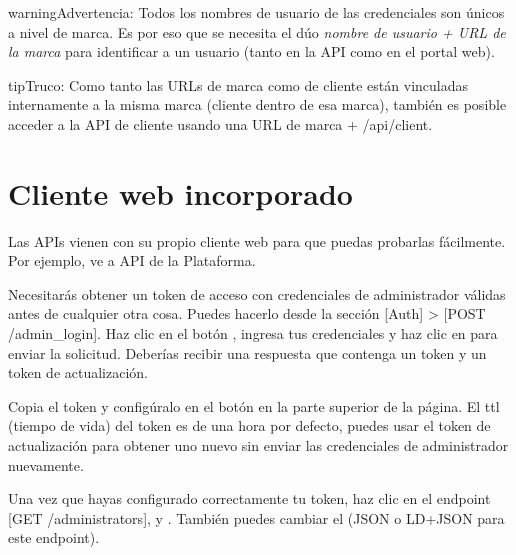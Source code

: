 \documentclass[letterpaper,10pt,spanish]{sphinxmanual}
\begin{document}
\begin{notice}{warning}{Advertencia:}
Todos los nombres de usuario de las credenciales son únicos a nivel de marca. Es por eso que se necesita el dúo \emph{nombre de usuario + URL de la marca} para identificar a un usuario (tanto en la API como en el portal web).
\end{notice}

\begin{notice}{tip}{Truco:}
Como tanto las URLs de marca como de cliente están vinculadas internamente a la misma marca (cliente dentro de esa marca), también es posible acceder a la API de cliente usando una URL de marca + /api/client.
\end{notice}


\chapter{Cliente web incorporado}
\label{api_rest/web_client:built-in-web-client}\label{api_rest/web_client::doc}
Las APIs vienen con su propio cliente web para que puedas probarlas fácilmente. Por ejemplo, ve a API de la Plataforma.


Necesitarás obtener un token de acceso con credenciales de administrador válidas antes de cualquier otra cosa. Puedes hacerlo desde la sección {[}Auth{]} \textgreater{} {[}POST /admin\_login{]}. Haz clic en el botón , ingresa tus credenciales y haz clic en  para enviar la solicitud. Deberías recibir una respuesta que contenga un token y un token de actualización.


Copia el token y configúralo en el botón  en la parte superior de la página. El ttl (tiempo de vida) del token es de una hora por defecto, puedes usar el token de actualización para obtener uno nuevo sin enviar las credenciales de administrador nuevamente.

Una vez que hayas configurado correctamente tu token, haz clic en el endpoint {[}GET /administrators{]},  y . También puedes cambiar el  (JSON o LD+JSON para este endpoint).
\end{document}
